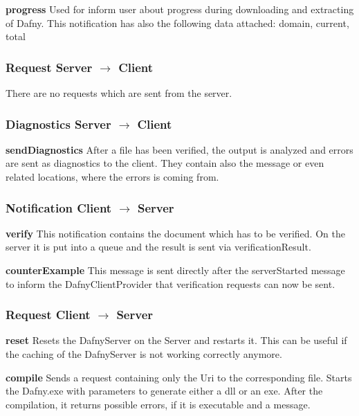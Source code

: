 \textbf{progress}
Used for inform user about progress during downloading and extracting of Dafny. This notification has also the following data attached: domain, current, total\newline

\subsubsection{Request Server $\longrightarrow$ Client}
There are no requests which are sent from the server. 


\subsubsection{Diagnostics Server $\longrightarrow$ Client}

\textbf{sendDiagnostics}
After a file has been verified, the output is analyzed and errors are sent as diagnostics to the client. They contain also the message or even related locations, where the errors is coming from.  \newline

\subsubsection{Notification Client $\longrightarrow$ Server}

\textbf{verify}
This notification contains the document which has to be verified. On the server it is put into a queue and the result is sent via verificationResult. \newline

\textbf{counterExample}
This message is sent directly after the serverStarted message to inform the DafnyClientProvider that verification requests can now be sent. \newline


\subsubsection{Request Client $\longrightarrow$ Server}

\textbf{reset}
Resets the DafnyServer on the Server and restarts it. This can be useful if the caching of the DafnyServer is not working correctly anymore. \newline

\textbf{compile}
Sends a request containing only the Uri to the corresponding file. Starts the Dafny.exe with parameters to generate either a dll or an exe. After the compilation, it returns possible errors, if it is executable and a message.\newline

